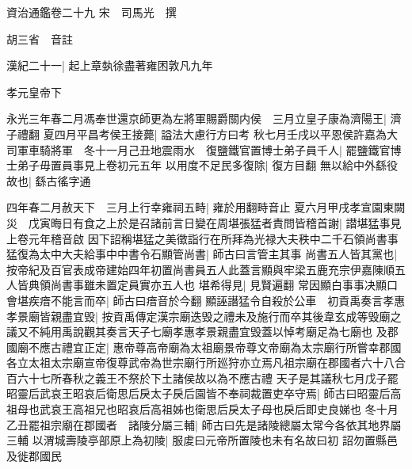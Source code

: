 資治通鑑卷二十九
宋　司馬光　撰

胡三省　音註

漢紀二十一|{
	起上章埶徐盡著雍困敦凡九年}


孝元皇帝下

永光三年春二月馮奉世還京師更為左將軍賜爵關内侯　三月立皇子康為濟陽王|{
	濟子禮翻}
夏四月平昌考侯王接薨|{
	謚法大慮行方曰考}
秋七月壬戌以平恩侯許嘉為大司軍車騎將軍　冬十一月己丑地震雨水　復鹽鐵官置博士弟子員千人|{
	罷鹽鐵官博士弟子毋置員事見上卷初元五年}
以用度不足民多復除|{
	復方目翻}
無以給中外繇役故也|{
	繇古徭字通}


四年春二月赦天下　三月上行幸雍祠五畤|{
	雍於用翻畤音止}
夏六月甲戌孝宣園東闕災　戊寅晦日有食之上於是召諸前言日變在周堪張猛者責問皆稽首謝|{
	譛堪猛事見上卷元年稽音啟}
因下詔稱堪猛之美徵詣行在所拜為光禄大夫秩中二千石領尚書事猛復為太中大夫給事中中書令石顯管尚書|{
	師古曰言管主其事}
尚書五人皆其黨也|{
	按帝紀及百官表成帝建始四年初置尚書員五人此蓋言顯與牢梁五鹿充宗伊嘉陳順五人皆典領尚書事雖未置定員實亦五人也}
堪希得見|{
	見賢遍翻}
常因顯白事事决顯口會堪疾瘖不能言而卒|{
	師古曰瘖音於今翻}
顯誣譖猛令自殺於公車　初貢禹奏言孝惠孝景廟皆親盡宜毁|{
	按貢禹傳定漢宗廟迭毁之禮未及施行而卒其後韋玄成等毁廟之議又不純用禹說觀其奏言天子七廟孝惠孝景親盡宜毁蓋以悼考廟足為七廟也}
及郡國廟不應古禮宜正定|{
	惠帝尊高帝廟為太祖廟景帝尊文帝廟為太宗廟行所嘗幸郡國各立太祖太宗廟宣帝復尊武帝為世宗廟行所廵狩亦立焉凡祖宗廟在郡國者六十八合百六十七所春秋之義王不祭於下土諸侯故以為不應古禮}
天子是其議秋七月戊子罷昭靈后武哀王昭哀后衛思后戾太子戾后園皆不奉祠裁置吏卒守焉|{
	師古曰昭靈后高祖母也武哀王高祖兄也昭哀后高祖姊也衛思后戾太子母也戾后即史良娣也}
冬十月乙丑罷祖宗廟在郡國者　諸陵分屬三輔|{
	師古曰先是諸陵總屬太常今各依其地界屬三輔}
以渭城壽陵亭部原上為初陵|{
	服䖍曰元帝所置陵也未有名故曰初}
詔勿置縣邑及徙郡國民

